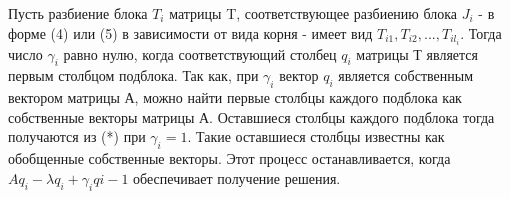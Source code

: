 \documentclass[14pt,a4paper,report]{report}
\begin{document}
\begin{itemize}
\begin{itemize}
		Пусть разбиение блока $T_i$ матрицы T, соответствующее разбиению блока $J_i$ - в форме (4) или (5) в зависимости от вида корня - имеет вид $T_{i1}, T_{i2}, ..., T_{il_i}$. Тогда число $\gamma_i$ равно нулю, когда соответствующий столбец $q_i$ матрицы Т является первым столбцом подблока. Так как, при $\gamma_i$ вектор $q_i$ является собственным вектором матрицы А, можно найти первые столбцы каждого подблока как собственные векторы матрицы А. Оставшиеся столбцы каждого подблока тогда получаются из (*) при $\gamma_i=1$. Такие оставшиеся столбцы известны как обобщенные собственные векторы. Этот процесс останавливается, когда $Aq_i-\lambda q_i+\gamma_iq{i-1}$ обеспечивает получение решения.
	\end{itemize}
		
\end{itemize}
\end{document}
